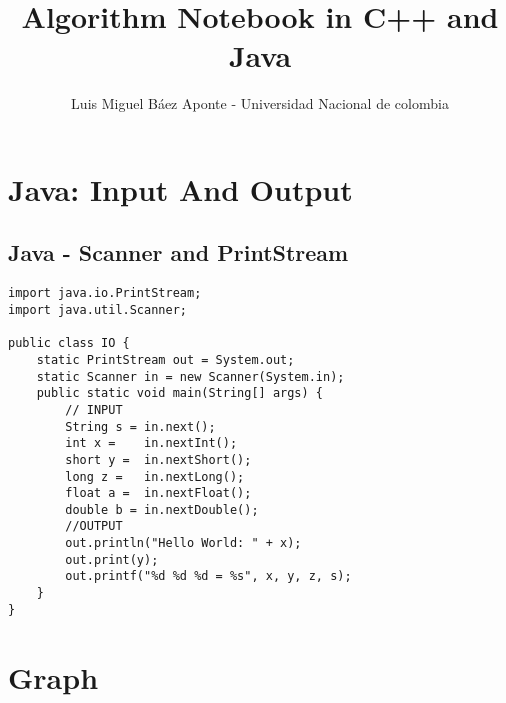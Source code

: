 \documentclass[10pt,letterpaper,twocolumn,twosided]{article}
\begin{document}
\title{Algorithm Notebook in C++ and Java}
\author{Luis Miguel Báez Aponte - Universidad Nacional de colombia}
\maketitle
\tableofcontents
{}

\section{Java: Input And Output}

\subsection{Java - Scanner and PrintStream}
\begin{lstlisting}
import java.io.PrintStream;
import java.util.Scanner;

public class IO {
    static PrintStream out = System.out;
    static Scanner in = new Scanner(System.in);
    public static void main(String[] args) {
        // INPUT
        String s = in.next();
        int x =    in.nextInt();
        short y =  in.nextShort();
        long z =   in.nextLong();
        float a =  in.nextFloat();
        double b = in.nextDouble();
        //OUTPUT
        out.println("Hello World: " + x);
        out.print(y);
        out.printf("%d %d %d = %s", x, y, z, s);
    }
}
\end{lstlisting}




\section{Graph}
\end{document}
